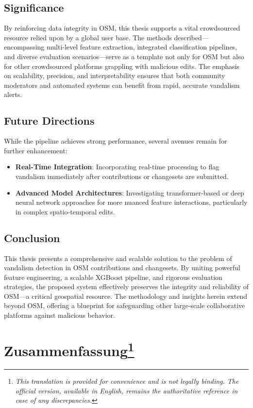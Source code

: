 \documentclass[
    13pt, %
    a4paper, %
    listof=totoc, %
    bibliography=totoc, %
    index=totoc, %
    headsepline
]{scrreprt}
\begin{document}
\subsection*{Significance}
\noindent
By reinforcing data integrity in OSM, this thesis supports a vital crowdsourced resource relied upon by a global user base. The methods described—encompassing multi-level feature extraction, integrated classification pipelines, and diverse evaluation scenarios—serve as a template not only for OSM but also for other crowdsourced platforms grappling with malicious edits. The emphasis on scalability, precision, and interpretability ensures that both community moderators and automated systems can benefit from rapid, accurate vandalism alerts.

\subsection*{Future Directions}
\noindent
While the pipeline achieves strong performance, several avenues remain for further enhancement:
\begin{itemize}
  \item \textbf{Real-Time Integration}: Incorporating real-time processing to flag vandalism immediately after contributions or changesets are submitted.
  \item \textbf{Advanced Model Architectures}: Investigating transformer-based or deep neural network approaches for more nuanced feature interactions, particularly in complex spatio-temporal edits.
\end{itemize}

\subsection*{Conclusion}
\noindent
This thesis presents a comprehensive and scalable solution to the problem of vandalism detection in OSM contributions and changesets. By uniting powerful feature engineering, a scalable XGBoost pipeline, and rigorous evaluation strategies, the proposed system effectively preserves the integrity and reliability of OSM—a critical geospatial resource. The methodology and insights herein extend beyond OSM, offering a blueprint for safeguarding other large-scale collaborative platforms against malicious behavior.


\newpage 
\section*{\LARGE Zusammenfassung\footnote{\textit{This translation is provided for convenience and is not legally binding. The official version, available in English, remains the authoritative reference in case of any discrepancies.}}}
\label{sec:german_summary}
\end{document}

